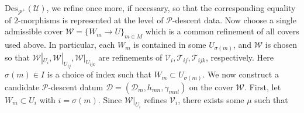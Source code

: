\documentclass[reqno]{amsart}
\theoremstyle{definition}
\theoremstyle{remark}
\begin{document}
$\text{Des}_{\mathscr P^+}(\mathcal U)$, we refine once more, if necessary, so that the corresponding equality of $2$-morphisms is represented at the level of $\mathscr P$-descent data. Now choose a single admissible cover $\mathcal{W}=\{W_m\to U\}_{m\in M}$ which is a common refinement of all covers used above. In particular, each
$W_m$ is contained in some $U_{\sigma(m)}$, and $\mathcal{W}$ is chosen so that $\mathcal{W}|_{U_i},\mathcal{W}|_{U_{ij}},\mathcal{W}|_{U_{ijk}}$ are refinements of $\mathcal V_i,\mathcal T_{ij},\mathcal T_{ijk}$, respectively. Here $\sigma(m)\in I$ is a choice of index such that $W_m\subset U_{\sigma(m)}$. We now construct a candidate $\mathscr P$-descent datum $
\mathcal D=(\mathcal D_m,h_{mn},\gamma_{mnl}) $ on the cover $\mathcal{W}$. First, let $W_m\subset U_i$ with $i=\sigma(m)$. Since $\mathcal{W}|_{U_i}$
refines $\mathcal V_i$, there exists some $\mu$ such that
\end{document}
